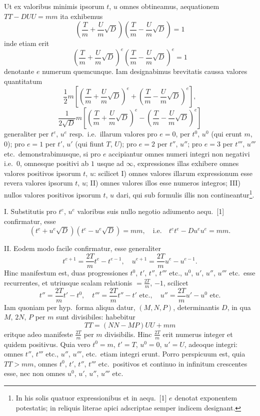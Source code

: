 \documentclass[12pt,a4paper]{article}
\theoremstyle{plain}
\begin{document}
Ut ex valoribus minimis ipsorum $t$, $u$ omnes obtineamus, aequationem $TT - DUU = mm$ ita exhibemus
\[
\left(\frac{T}{m} + \frac{U}{m}\sqrt{D}\right)\left(\frac{T}{m} - \frac{U}{m}\sqrt{D}\right) = 1
\]
inde etiam erit
\[
\left(\frac{T}{m} + \frac{U}{m}\sqrt{D}\right)^e \left(\frac{T}{m} - \frac{U}{m}\sqrt{D}\right)^e = 1 \tag{1}
\]
denotante $e$ numerum quemcunque. Iam designabimus brevitatis caussa valores quantitatum
\[
\frac{1}{2}m\left[\left(\frac{T}{m} + \frac{U}{m}\sqrt{D}\right)^e + \left(\frac{T}{m} - \frac{U}{m}\sqrt{D}\right)^e\right],
\]
\[
\frac{1}{2\sqrt{D}}m\left[\left(\frac{T}{m} + \frac{U}{m}\sqrt{D}\right)^e - \left(\frac{T}{m} - \frac{U}{m}\sqrt{D}\right)^e\right]
\]
generaliter per $t^e$, $u^e$ resp.~i.e.~illarum valores pro $e = 0$, per $t^0$, $u^0$ (qui erunt $m$, $0$); pro $e = 1$ per $t'$, $u'$ (qui fiunt $T$, $U$); pro $e = 2$ per $t''$, $u''$; pro $e = 3$ per $t'''$, $u'''$ etc.~demonstrabimusque, si pro $e$ accipiantur omnes numeri integri non negativi i.e.~$0$, omnesque positivi ab $1$ usque ad $\infty$, expressiones illas exhibere omnes valores positivos ipsorum $t$, $u$: scilicet I) omnes valores illarum expressionum esse revera valores ipsorum $t$, $u$; II) omnes valores illos esse numeros integros; III) nullos valores positivos ipsorum $t$, $u$ dari, qui sub formulis illis non contineantur\footnote{In his solis quatuor expressionibus et in aequ.~[1] $e$ denotat exponentem potestatis; in reliquis literae apici adscriptae semper indicem designant.}.

I. Substitutis pro $t^e$, $u^e$ valoribus suis nullo negotio adiumento aequ.~[1] confirmatur, esse
\[
(t^e + u^e\sqrt{D})(t^e - u^e\sqrt{D}) = mm, \quad \text{i.e.} \quad t^e t^e - Du^e u^e = mm.
\]

II. Eodem modo facile confirmatur, esse generaliter
\[
t^{e+1} = \frac{2T}{m}t^e - t^{e-1}, \quad u^{e+1} = \frac{2T}{m}u^e - u^{e-1}.
\]
Hinc manifestum est, duas progressiones $t^0$, $t'$, $t''$, $t'''$ etc., $u^0$, $u'$, $u''$, $u'''$ etc.~esse recurrentes, et utriusque scalam relationis $= \frac{2T}{m}$, $-1$, scilicet
\[
t'' = \frac{2T}{m}t' - t^0, \quad t''' = \frac{2T}{m}t'' - t' \text{ etc.}, \quad u'' = \frac{2T}{m}u' - u^0 \text{ etc.}
\]
Iam quoniam per hyp.~forma aliqua datur, $(M, N, P)$, determinantis $D$, in qua $M$, $2N$, $P$ per $m$ sunt divisibiles: habebitur
\[
TT = (NN - MP)UU + mm
\]
eritque adeo manifeste $\frac{2T}{m}$ per $m$ divisibilis. Hinc $\frac{2T}{m}$ erit numerus integer et quidem positivus. Quia vero $t^0 = m$, $t' = T$, $u^0 = 0$, $u' = U$, adeoque integri: omnes $t''$, $t'''$ etc., $u''$, $u'''$, etc.~etiam integri erunt. Porro perspicuum est, quia $TT > mm$, omnes $t^0$, $t'$, $t''$, $t'''$ etc.~positivos et continuo in infinitum crescentes esse, nec non omnes $u^0$, $u'$, $u''$, $u'''$ etc.
\end{document}
